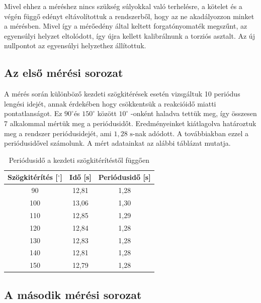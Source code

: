 \documentclass{article}
\begin{document}
Mivel ehhez a méréshez nincs szükség súlyokkal való terhelésre, a kötelet és a végén függő edényt eltávolítottuk a rendszerből, hogy az ne akadályozzon minket a mérésben. Mivel így a mérőedény által keltett forgatónyomaték megszűnt, az egyensúlyi helyzet eltolódott, így újra kellett kalibrálnunk a torziós asztalt. Az új nullpontot az egyensúlyi helyzethez állítottuk.

\subsection*{Az első mérési sorozat}

A mérés során különböző kezdeti szögkitérések esetén vizsgáltuk 10 periódus lengési idejét, annak érdekében hogy csökkentsük a reakcióidő miatti pontatlanságot. Ez $90^\circ$és $150^\circ$ között $10^\circ$ -onként haladva tettük meg, így összesen 7 alkalommal mértük meg a periódusidőt. Eredményeinket kiátlagolva határoztuk meg a rendszer periódusidejét, ami $1,28\text{ s}$-nak adódott. A továbbiakban ezzel a periódusidővel számolunk. A mért adatainkat az alábbi táblázat mutatja.

\begin{table}[H]
    \centering
    \begin{tabular}{|c|c|c|}
        \hline
        Szögkitérítés [$^\circ$] & Idő [s] & Periódusidő [s] \\ \hline
        90                       & 12,81   & 1,28            \\ \hline 
        100                      & 13,06   & 1,30            \\ \hline
        110                      & 12,85   & 1,29            \\ \hline 
        120                      & 12,84   & 1,28            \\ \hline
        130                      & 12,83   & 1,28            \\ \hline 
        140                      & 12,81   & 1,28            \\ \hline
        150                      & 12,79   & 1,28            \\ \hline 
    \end{tabular}
    \caption{Periódusidő a kezdeti szögkitérítéstől függően}
    \label{tab:periodusido_1}
\end{table}

\subsection*{A második mérési sorozat}
\end{document}
